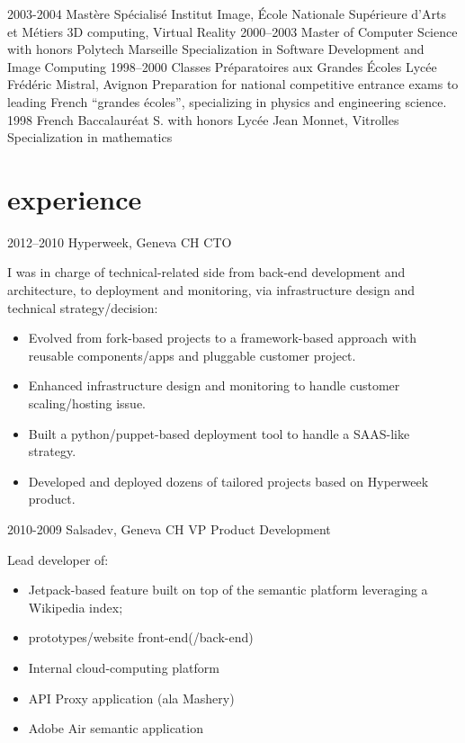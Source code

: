 \documentclass[]{friggeri-cv}
\begin{document}
\begin{entrylist}
  \entry
    {2003-2004}
    {Mastère Spécialisé}
    {Institut Image, École Nationale Supérieure d'Arts et Métiers}
    {3D computing, Virtual Reality}
  \entry
    {2000–2003}
    {Master of Computer Science with honors}
    {Polytech Marseille}
    {Specialization in Software Development and Image Computing}
  \entry
    {1998–2000}
    {Classes Préparatoires aux Grandes Écoles}
    {Lycée Frédéric Mistral, Avignon}
    {Preparation for national competitive entrance exams to leading French ``grandes écoles'', specializing in physics and engineering science.}
  \entry
    {1998}
    {French Baccalauréat S. with honors}
    {Lycée Jean Monnet, Vitrolles}
    {Specialization in mathematics}
\end{entrylist}

\section{experience}

\begin{entrylist}
  \entry
    {2012–2010}
    {Hyperweek, Geneva CH}
    {CTO}
    {I was in charge of technical-related side from back-end development and architecture, to deployment and monitoring, via infrastructure design and technical strategy/decision:
    \begin{itemize}
    \item Evolved from fork-based projects to a framework-based approach with reusable components/apps and pluggable customer project.
    \item Enhanced infrastructure design and monitoring to handle customer scaling/hosting issue.
    \item Built a python/puppet-based deployment tool to handle a SAAS-like strategy.
    \item Developed and deployed dozens of tailored projects based on Hyperweek product.
    \end{itemize}}
  \entry
    {2010-2009}
    {Salsadev, Geneva CH}
    {VP Product Development}
    {Lead developer of:
    \begin{itemize}
    \item Jetpack-based feature built on top of the semantic platform leveraging a Wikipedia index;
    \item prototypes/website front-end(/back-end)
    \item Internal cloud-computing platform
    \item API Proxy application (ala Mashery)
    \item Adobe Air semantic application
    \end{itemize}}
\end{entrylist}
\end{document}
